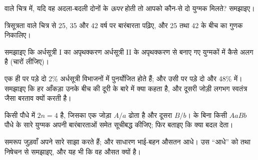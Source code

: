 \begin{exercise}[$\star\star$]\label{exo:g12:meiosis-genetic-shuffling:9}
 वाले चित्र में, यदि वह अदला-बदली दोनों  के \emph{ऊपर} होती
तो आपको कौन-से दो युग्मक मिलते? समझाइए।
\end{exercise}

\begin{exercise}[$\star\star$]\label{exo:g12:meiosis-genetic-shuffling:10}
त्रिसूत्रता वाले चित्र से 25, 35 और 42 वर्ष पर बारंबारता पढ़िए, और 25 तथा
42 के बीच का गुणक निकालिए।
\end{exercise}

\begin{exercise}[$\star\star$]\label{exo:g12:meiosis-genetic-shuffling:11}
समझाइए कि अर्धसूत्री I का अपृथक्करण अर्धसूत्री II के अपृथक्करण से बनाए गए
युग्मकों में कैसे अलग है (चारों  लीजिए)।
\end{exercise}

\begin{exercise}[$\star\star\star$]\label{exo:g12:meiosis-genetic-shuffling:12}
एक ही  पर पड़े दो  2\% अर्धसूत्री विभाजनों में पुनर्योजित होते
हैं; और उसी  पर पड़े दो और 48\% में। समझाइए कि हर आँकड़ा उनके बीच
की दूरी के बारे में क्या कहता है, और दूसरी जोड़ी लगभग स्वतंत्र  जैसा
बरताव क्यों करती है।
\end{exercise}

\begin{exercise}[$\star\star\star$]\label{exo:g12:meiosis-genetic-shuffling:13}
किसी पौधे में $2n = 4$ है, जिसका एक जोड़ा $A/a$ ढोता है और दूसरा $B/b$।
 के बिना किसी $AaBb$ पौधे के सारे युग्मक अपनी बारंबारताओं समेत
सूचीबद्ध कीजिए; फिर बताइए कि  क्या बदल देता।
\end{exercise}

\begin{exercise}[$\star\star\star$]\label{exo:g12:meiosis-genetic-shuffling:14}
समरूप जुड़वाँ अपने सारे  साझा करते हैं; और साधारण भाई-बहन औसतन
आधे। उस ``आधे'' को  तथा निषेचन से समझाइए, और यह भी कि वह
औसत क्यों है।
\end{exercise}

